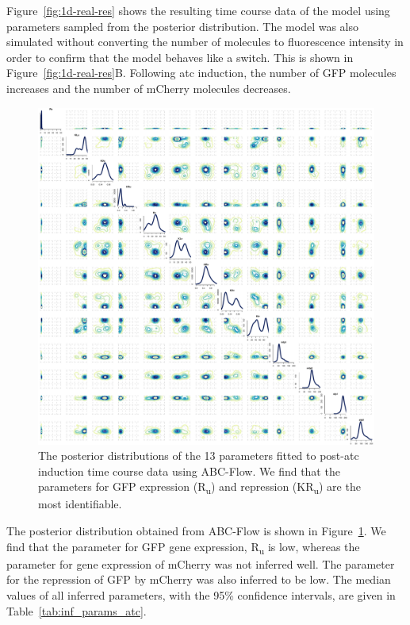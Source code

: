 Figure~\ref{fig:1d-real-res} shows the resulting time course data of the model using parameters sampled from the posterior distribution. The model was also simulated without converting the number of molecules to fluorescence intensity in order to confirm that the model behaves like a switch. This is shown in Figure~\ref{fig:1d-real-res}B. Following \acrshort{atc} induction, the number of GFP molecules increases and the number of mCherry molecules decreases. 

\begin{figure}[tb]
\centerfloat
	\includegraphics[width=\textwidth]{../../chapters/chapterABCFlow/images/real_data_stuff/posterior2D_pop10_100p.pdf}
	\caption[Posterior distribution of inferred parameters for post-\acrshort{atc} induction of the toggle switch]{\label{fig:1atc-post} The posterior distributions of the 13 parameters fitted to post-\acrshort{atc} induction time course data using ABC-Flow. We find that the parameters for GFP expression (R\textsubscript{u}) and repression (KR\textsubscript{u}) are the most identifiable.}
\end{figure}


The posterior distribution obtained from ABC-Flow is shown in Figure~\ref{fig:1atc-post}. We find that the parameter for GFP gene expression, R\textsubscript{u}  is low, whereas the parameter for gene expression of mCherry was not inferred well. The parameter for the repression of GFP by mCherry was also inferred to be low. The median values of all inferred parameters, with the 95\% confidence intervals, are given in Table~\ref{tab:inf_params_atc}. 

